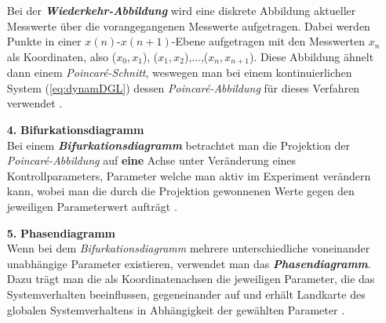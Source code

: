 \begin{itemize}
    Bei der \textit{\textbf{Wiederkehr-Abbildung}} wird eine diskrete Abbildung aktueller Messwerte über die vorangegangenen Messwerte aufgetragen. Dabei werden Punkte in einer $x(n)$-$x(n+1)$-Ebene aufgetragen mit den Messwerten $x_n$ als Koordinaten, also ($x_0,x_1$), ($x_1,x_2$),...,($x_n,x_{n+1}$). Diese Abbildung ähnelt dann einem \textit{Poincar\'e-Schnitt}, weswegen man bei einem kontinuierlichen System (\ref{eq:dynamDGL}) dessen \textit{Poincar\'e-Abbildung} für dieses Verfahren verwendet \citep{Lueck}.
    \item[\textbf{4.}]{\textbf{Bifurkationsdiagramm}}\\
    Bei einem \textit{\textbf{Bifurkationsdiagramm}} betrachtet man die Projektion der \textit{Poincar\'e-Abbildung} auf \textbf{eine} Achse unter Veränderung eines Kontrollparameters, Parameter welche man aktiv im Experiment verändern kann, wobei man die durch die Projektion gewonnenen Werte gegen den jeweiligen Parameterwert aufträgt \citep{Lueck}.
    \newpage
    \item[\textbf{5.}]{\textbf{Phasendiagramm}}\\
    Wenn bei dem \textit{Bifurkationsdiagramm} mehrere unterschiedliche voneinander unabhängige Parameter existieren, verwendet man das \textit{\textbf{Phasendiagramm}}. Dazu trägt man die als Koordinatenachsen die jeweiligen Parameter, die das Systemverhalten beeinflussen, gegeneinander auf und erhält Landkarte des globalen Systemverhaltens in Abhängigkeit der gewählten Parameter \citep{Lueck}.  
\end{itemize}